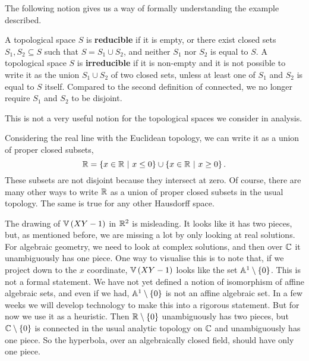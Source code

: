 The following notion gives us a way of formally understanding the example described.

\begin{definition*}
A topological space $ S $ is \textbf{reducible} if it is empty, or there exist closed sets $ S_1, S_2 \subseteq S $ such that $ S = S_1 \cup S_2 $, and neither $ S_1 $ nor $ S_2 $ is equal to $ S $. A topological space $ S $ is \textbf{irreducible} if it is non-empty and it is not possible to write it as the union $ S_1 \cup S_2 $ of two closed sets, unless at least one of $ S_1 $ and $ S_2 $ is equal to $ S $ itself. Compared to the second definition of connected, we no longer require $ S_1 $ and $ S_2 $ to be disjoint.
\end{definition*}

This is not a very useful notion for the topological spaces we consider in analysis.

\begin{example*}
Considering the real line with the Euclidean topology, we can write it as a union of proper closed subsets,
$$ \RR = \cbr{x \in \RR \st x \le 0} \cup \cbr{x \in \RR \st x \ge 0}. $$
These subsets are not disjoint because they intersect at zero. Of course, there are many other ways to write $ \mathbb{R} $ as a union of proper closed subsets in the usual topology. The same is true for any other Hausdorff space.
\end{example*}

\pagebreak

\begin{example*}
The drawing of $ \VV\br{XY - 1} $ in $ \mathbb{R}^2 $ is misleading. It looks like it has two pieces, but, as mentioned before, we are missing a lot by only looking at real solutions. For algebraic geometry, we need to look at complex solutions, and then over $ \mathbb{C} $ it unambiguously has one piece. One way to visualise this is to note that, if we project down to the $ x $ coordinate, $ \VV\br{XY - 1} $ looks like the set $ \AA^1 \setminus \cbr{0} $. This is not a formal statement. We have not yet defined a notion of isomorphism of affine algebraic sets, and even if we had, $ \AA^1 \setminus \cbr{0} $ is not an affine algebraic set. In a few weeks we will develop technology to make this into a rigorous statement. But for now we use it as a heuristic. Then $ \RR \setminus \cbr{0} $ unambiguously has two pieces, but $ \CC \setminus \cbr{0} $ is connected in the usual analytic topology on $ \mathbb{C} $ and unambiguously has one piece. So the hyperbola, over an algebraically closed field, should have only one piece.
\end{example*}

